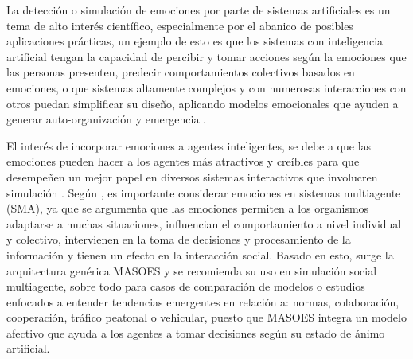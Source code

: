 %
%
%



La detección o simulación de emociones por parte de sistemas artificiales es un
tema de alto interés científico, especialmente por el abanico de posibles
aplicaciones prácticas, un ejemplo de esto es que los sistemas con inteligencia
artificial tengan la capacidad de percibir y tomar acciones según la emociones
que las personas presenten, predecir comportamientos colectivos basados en
emociones, o que sistemas altamente complejos y con numerosas interacciones con
otros puedan simplificar su diseño, aplicando modelos emocionales que ayuden a
generar auto-organización y emergencia \citep{perozo2011}.

El interés de incorporar emociones a agentes inteligentes, se debe a que las
emociones pueden hacer a los agentes más atractivos y creíbles para que
desempeñen un mejor papel en diversos sistemas interactivos que involucren
simulación \citep{jiang2007}. Según \cite{perozo2012}, es importante considerar
emociones en sistemas multiagente (SMA), ya que se argumenta que las emociones
permiten a los organismos adaptarse a muchas situaciones, influencian el
comportamiento a nivel individual y colectivo, intervienen en la toma de
decisiones y procesamiento de la información y tienen un efecto en la
interacción social. Basado en esto, surge la arquitectura genérica
MASOES y se recomienda su uso en simulación social multiagente, sobre todo para
casos de comparación de modelos o estudios enfocados a entender tendencias
emergentes en relación a: normas, colaboración, cooperación, tráfico peatonal o
vehicular, puesto que MASOES integra un modelo afectivo que ayuda a los
agentes a tomar decisiones según su estado de ánimo artificial.

